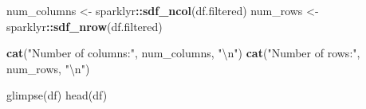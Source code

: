 \documentclass[]{article}
\newenvironment{Shaded}{\begin{snugshade}}{\end{snugshade}}
\newcommand{\CharTok}[1]{\textcolor[rgb]{0.31,0.60,0.02}{#1}}
\newcommand{\KeywordTok}[1]{\textcolor[rgb]{0.13,0.29,0.53}{\textbf{#1}}}
\newcommand{\NormalTok}[1]{#1}
\newcommand{\OperatorTok}[1]{\textcolor[rgb]{0.81,0.36,0.00}{\textbf{#1}}}
\newcommand{\StringTok}[1]{\textcolor[rgb]{0.31,0.60,0.02}{#1}}
\begin{document}
\begin{Shaded}
\end{Shaded}

\begin{Shaded}
\begin{Highlighting}[]
\NormalTok{num_columns <-}\StringTok{ }\NormalTok{sparklyr}\OperatorTok{::}\KeywordTok{sdf_ncol}\NormalTok{(df.filtered)}
\NormalTok{num_rows <-}\StringTok{ }\NormalTok{sparklyr}\OperatorTok{::}\KeywordTok{sdf_nrow}\NormalTok{(df.filtered)}

\KeywordTok{cat}\NormalTok{(}\StringTok{"Number of columns:"}\NormalTok{, num_columns, }\StringTok{"}\CharTok{\textbackslash{}n}\StringTok{"}\NormalTok{)}
\KeywordTok{cat}\NormalTok{(}\StringTok{"Number of rows:"}\NormalTok{, num_rows, }\StringTok{"}\CharTok{\textbackslash{}n}\StringTok{"}\NormalTok{)}
\end{Highlighting}
\end{Shaded}

glimpse(df) head(df)
\end{document}
